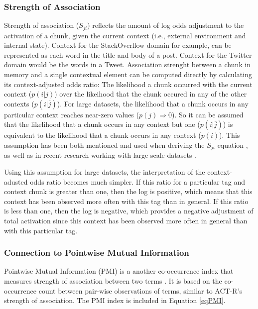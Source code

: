 \documentclass[man,floatsintext]{apa6}
\begin{document}
\subsubsection{Strength of Association}

Strength of association ($S_{ji}$) reflects the amount of log odds adjustment to the activation of a chunk, given the current context (i.e., external environment and internal state).
Context for the StackOverflow domain for example, can be represented as each word in the title and body of a post.
Context for the Twitter domain would be the words in a Tweet.
Association strenght between a chunk in memory and a single contextual element can be computed directly by calculating its context-adjusted odds ratio:
The likelihood a chunk occurred with the current context ($p(i|j)$) over the likeihood that the chunk occured in any of the other contexts ($p(i|\overline{j})$).
For large datasets, the likelihood that a chunk occurs in any particular context reaches near-zero values ($p(j) \Rightarrow 0$).
So it can be assumed that the likelihood that a chunk occurs in any context but one ($p(i|\overline{j})$) is equivalent to the likelihood that a chunk occurs in any context ($p(i)$).
This assumption has been both mentioned and used when deriving the $S_{ji}$ equation \parencite{Anderson1989}, as well as in recent research working with large-scale datasets \parencite{Stanley2013}.

Using this assumption for large datasets, the interpretation of the context-adusted odds ratio becomes much simpler.
If this ratio for a particular tag and context chunk is greater than one, then the log is positive, which means that this context has been observed more often with this tag than in general.
If this ratio is less than one, then the log is negative, which provides a negative adjustment of total activation since this context has been observed more often in general than with this particular tag.

\subsubsection{Connection to Pointwise Mutual Information}

Pointwise Mutual Information (PMI) is a another co-occurrence index that measures strength of association between two terms \parencite{Farahat2004}.
It is based on the co-occurrence count between pair-wise observations of terms, similar to ACT-R's strength of association.
The PMI index is included in Equation \eqref{eqPMI}.
\end{document}

